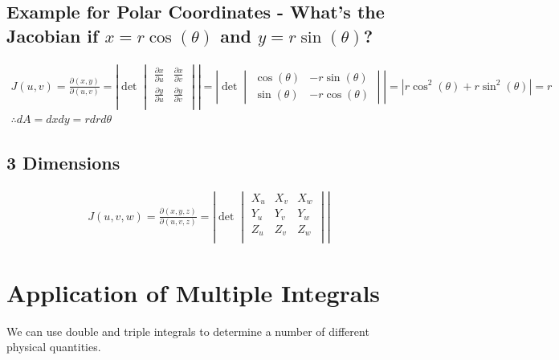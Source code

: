 \documentclass{article}
\begin{document}
    \subsection{Example for Polar Coordinates - What's the Jacobian if $x=r\cos(\theta)$ and $y=r\sin(\theta)$?}
    \[
    \begin{aligned}
        J(u,v) = \frac{\partial (x,y)}{\partial (u,v)} = 
        \left\lvert
        \det
        \begin{vmatrix}
        \frac{\partial x}{\partial u} & \frac{\partial x}{\partial v}\\
        \frac{\partial y}{\partial u} & \frac{\partial y}{\partial v}\\
        \end{vmatrix}\right\rvert = 
        \left\lvert
        \det
        \begin{vmatrix}
        \cos(\theta) & -r\sin(\theta) \\
        \sin(\theta) & -r\cos(\theta)
        \end{vmatrix}
        \right\rvert = 
        \left\lvert
        r\cos^2(\theta)+r\sin^2(\theta)
        \right\rvert = r\\
        \therefore dA=dxdy=rdrd\theta
    \end{aligned}
    \]

    \subsection{3 Dimensions}
    \begin{equation}
    \begin{aligned}
    J(u,v,w) = \frac{\partial (x,y,z)}{\partial (u,v,z)} = 
    \left\lvert
    \det
    \begin{vmatrix}
    X_u & X_v & X_w \\
    Y_u & Y_v & Y_w \\
    Z_u & Z_v & Z_w \\
    \end{vmatrix}
    \right\rvert
    \end{aligned}
    \end{equation}

\section{Application of Multiple Integrals}
We can use double and triple integrals to determine a number of different physical quantities.\\
\end{document}
